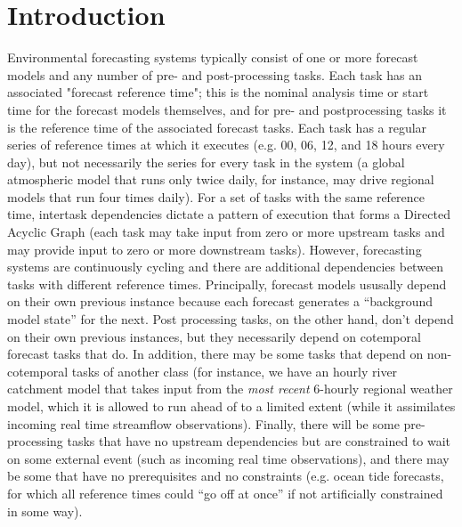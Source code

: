 \documentclass[11pt,a4paper]{article}
\begin{document}
\section{Introduction}

Environmental forecasting systems typically consist of one or more
forecast models and any number of pre- and post-processing tasks. Each
task has an associated "forecast reference time"; this is the nominal
analysis time or start time for the forecast models themselves, and for
pre- and postprocessing tasks it is the reference time of the associated
forecast tasks. Each task has a regular series of reference times at
which it executes (e.g. 00, 06, 12, and 18 hours every day), but not
necessarily the series for every task in the system (a global
atmospheric model that runs only twice daily, for instance, may drive
regional models that run four times daily). For a set of tasks with the
same reference time, intertask dependencies dictate a pattern of
execution that forms a Directed Acyclic Graph (each task may take input
from zero or more upstream tasks and may provide input to zero or more
downstream tasks). However, forecasting systems are continuously cycling
and there are additional dependencies between tasks with different
reference times.  Principally, forecast models ususally depend on their
own previous instance because each forecast generates a ``background
model state'' for the next. Post processing tasks, on the other hand,
don't depend on their own previous instances, but they necessarily
depend on cotemporal forecast tasks that do. In addition, there may be
some tasks that depend on non-cotemporal tasks of another class (for
instance, we have an hourly river catchment model that takes input from
the {\em most recent} 6-hourly regional weather model, which it is
allowed to run ahead of to a limited extent (while it assimilates
incoming real time streamflow observations). Finally, there will be some
pre-processing tasks that have no upstream dependencies but are
constrained to wait on some external event (such as incoming real time
observations), and there may be some that have no prerequisites and no
constraints (e.g. ocean tide forecasts, for which all reference times
could ``go off at once'' if not artificially constrained in some way).  
\end{document}
